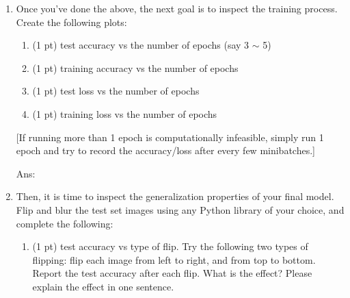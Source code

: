 \documentclass[10pt,letterpaper]{article}
\newcommand{\red}[1]{{\color{red}#1}}
\newcommand{\ans}[1]{{\color{orange}\textsf{Ans}: #1}}
\begin{document}
\begin{exercise}
\begin{enumerate}[label=\alph*)]
		For your convenience, we list the details of the VGG11 architecture here.
		The convolutional layers are denoted as \texttt{Conv(number of input channels, number of output channels, kernel size, stride, padding)};
		the batch normalization layers  are denoted as \texttt{BatchNorm(number of channels)};
		the max-pooling layers are denoted as \texttt{MaxPool(kernel size, stride)};
		the fully-connected layers are denoted as \texttt{FC(number of input features, number of output features)};
		the drop out layers are denoted as \texttt{Dropout(dropout ratio)}:
		\begin{verbatim}
		- Conv(001, 064, 3, 1, 1) - BatchNorm(064) - ReLU - MaxPool(2, 2)
		- Conv(064, 128, 3, 1, 1) - BatchNorm(128) - ReLU - MaxPool(2, 2)
		- Conv(128, 256, 3, 1, 1) - BatchNorm(256) - ReLU 
		- Conv(256, 256, 3, 1, 1) - BatchNorm(256) - ReLU - MaxPool(2, 2)
		- Conv(256, 512, 3, 1, 1) - BatchNorm(512) - ReLU 
		- Conv(512, 512, 3, 1, 1) - BatchNorm(512) - ReLU - MaxPool(2, 2)
		- Conv(512, 512, 3, 1, 1) - BatchNorm(512) - ReLU 
		- Conv(512, 512, 3, 1, 1) - BatchNorm(512) - ReLU - MaxPool(2, 2)
		- FC(0512, 4096) - ReLU - Dropout(0.5) 
		- FC(4096, 4096) - ReLU - Dropout(0.5) 
		- FC(4096, 10)
		\end{verbatim}
		You should use the cross-entropy loss at the end.
		
		[This experiment will take up to 1 hour on a CPU, so please be cautious of your time. If this running time is not bearable, you may cut the training set to 1/10, so only have $\sim$600 images per class instead of the regular $\sim$6000.]
		
		\item Once you've done the above, the next goal is to inspect the training process. Create the following plots:
      \begin{enumerate}[label=(\roman*)]
			\item (1 pt) test accuracy vs the number of epochs (say 3 $\sim$ 5)
			\item (1 pt) training accuracy vs the number of epochs
			\item (1 pt) test loss vs the number of epochs
			\item (1 pt) training loss vs the number of epochs
		\end{enumerate}
		[If running more than 1 epoch is computationally infeasible, simply run 1 epoch and try to record the accuracy/loss after every few minibatches.]
		
		\ans{}
		
		\item Then, it is time to inspect the generalization properties of your final model. Flip and blur the \red{test set images} using any Python library of your choice, and complete the following:		
      \begin{enumerate}[label=(\roman*)]
			\item (1 pt) test accuracy vs type of flip. Try the following two types of flipping: flip each image from left to right, and from top to bottom. Report the test accuracy after each flip. What is the effect? Please explain the effect in one sentence.
			

\end{enumerate}
\end{enumerate}
\end{exercise}
\end{document}
